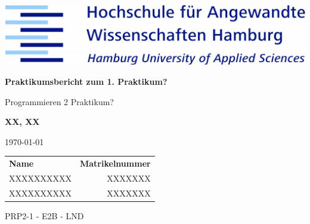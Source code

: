 \documentclass[12pt]{scrreprt}
\begin{document}
\parindent 0pt %

\begin{titlepage}
	
	\centering
	\begin{figure}
		\vspace*{0cm}	
	\end{figure}
	
	\includegraphics[width=14cm]{img/haw_logo.jpg}\par
	\vspace{3cm}
	
	{\huge\bfseries Praktikumsbericht zum 1. Praktikum?\par}

	\vspace{0.5cm}

	{\LARGE Programmieren 2 Praktikum?\par}
	
	\vspace{1.5cm}
	
	{\Large \bfseries XX, XX\par}
	
	\vspace{1.5cm}

	{\large \today\par}

	\vspace{5cm}

	\begin{tabular}{lr}
		\rule[-1ex]{0pt}{2.5ex} \textbf{Name} \hspace{2cm} & \textbf{Matrikelnummer }\\  
		\rule[-1ex]{0pt}{2.5ex} XXXXXXXXXX & XXXXXXX \\ 
		\rule[-1ex]{0pt}{2.5ex} XXXXXXXXXX & XXXXXXX \\ 	
	\end{tabular} 
	\vfill
	{PRP2-1 - E2B - LND} 
	

		
	
\end{titlepage}
\thispagestyle{fancy}
\thispagestyle{fancy}






\end{document}
